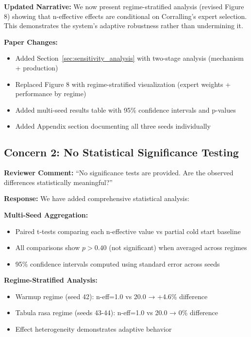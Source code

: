 \textbf{Updated Narrative:} We now present regime-stratified analysis (revised Figure 8) showing that n-effective effects are conditional on Corralling's expert selection. This demonstrates the system's adaptive robustness rather than undermining it.

\textbf{Paper Changes:}
\begin{itemize}[leftmargin=*, itemsep=2pt]
    \item Added Section~\ref{sec:sensitivity_analysis} with two-stage analysis (mechanism + production)
    \item Replaced Figure 8 with regime-stratified visualization (expert weights + performance by regime)
    \item Added multi-seed results table with 95\% confidence intervals and p-values
    \item Added Appendix section documenting all three seeds individually
\end{itemize}


\subsection*{Concern 2: No Statistical Significance Testing}

\textbf{Reviewer Comment:} ``No significance tests are provided. Are the observed differences statistically meaningful?''

\textbf{Response:} We have added comprehensive statistical analysis:

\textbf{Multi-Seed Aggregation:}
\begin{itemize}[leftmargin=*, itemsep=2pt]
    \item Paired t-tests comparing each n-effective value vs partial cold start baseline
    \item All comparisons show $p>0.40$ (not significant) when averaged across regimes
    \item 95\% confidence intervals computed using standard error across seeds
\end{itemize}

\textbf{Regime-Stratified Analysis:}
\begin{itemize}[leftmargin=*, itemsep=2pt]
    \item Warmup regime (seed 42): n-eff=1.0 vs 20.0 → +4.6\% difference
    \item Tabula rasa regime (seeds 43-44): n-eff=1.0 vs 20.0 → 0\% difference
    \item Effect heterogeneity demonstrates adaptive behavior
\end{itemize}

